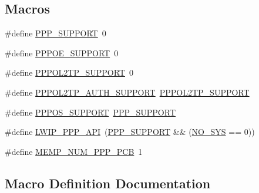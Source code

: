 \subsection*{Macros}
\begin{DoxyCompactItemize}
\item 
\#define \hyperlink{openmote-cc2538_2lwip_2src_2include_2netif_2ppp_2ppp__opts_8h_a746c0ebaef5399987d53a1426eba6273}{P\+P\+P\+\_\+\+S\+U\+P\+P\+O\+RT}~0
\item 
\#define \hyperlink{openmote-cc2538_2lwip_2src_2include_2netif_2ppp_2ppp__opts_8h_a71adab1a13b02856a922cf3edbda71b1}{P\+P\+P\+O\+E\+\_\+\+S\+U\+P\+P\+O\+RT}~0
\item 
\#define \hyperlink{openmote-cc2538_2lwip_2src_2include_2netif_2ppp_2ppp__opts_8h_a65f133dc4016cc42044f1bd2b941038f}{P\+P\+P\+O\+L2\+T\+P\+\_\+\+S\+U\+P\+P\+O\+RT}~0
\item 
\#define \hyperlink{openmote-cc2538_2lwip_2src_2include_2netif_2ppp_2ppp__opts_8h_a07cb038932116ecff7f0533d2cacc2b9}{P\+P\+P\+O\+L2\+T\+P\+\_\+\+A\+U\+T\+H\+\_\+\+S\+U\+P\+P\+O\+RT}~\hyperlink{openmote-cc2538_2lwip_2src_2include_2netif_2ppp_2ppp__opts_8h_a65f133dc4016cc42044f1bd2b941038f}{P\+P\+P\+O\+L2\+T\+P\+\_\+\+S\+U\+P\+P\+O\+RT}
\item 
\#define \hyperlink{openmote-cc2538_2lwip_2src_2include_2netif_2ppp_2ppp__opts_8h_ade11e60136d3d55e35f917f155dc13b9}{P\+P\+P\+O\+S\+\_\+\+S\+U\+P\+P\+O\+RT}~\hyperlink{openmote-cc2538_2lwip_2src_2include_2netif_2ppp_2ppp__opts_8h_a746c0ebaef5399987d53a1426eba6273}{P\+P\+P\+\_\+\+S\+U\+P\+P\+O\+RT}
\item 
\#define \hyperlink{openmote-cc2538_2lwip_2src_2include_2netif_2ppp_2ppp__opts_8h_a5a03fca0248c5e630f89afb39d2f0065}{L\+W\+I\+P\+\_\+\+P\+P\+P\+\_\+\+A\+PI}~(\hyperlink{openmote-cc2538_2lwip_2src_2include_2netif_2ppp_2ppp__opts_8h_a746c0ebaef5399987d53a1426eba6273}{P\+P\+P\+\_\+\+S\+U\+P\+P\+O\+RT} \&\& (\hyperlink{openmote-cc2538_2lwip_2test_2unit_2lwipopts_8h_ae00ba99de94a5bf84d832be8976df59b}{N\+O\+\_\+\+S\+YS} == 0))
\item 
\#define \hyperlink{openmote-cc2538_2lwip_2src_2include_2netif_2ppp_2ppp__opts_8h_a6721ea95cbd6afd6968470c2423b6482}{M\+E\+M\+P\+\_\+\+N\+U\+M\+\_\+\+P\+P\+P\+\_\+\+P\+CB}~1
\end{DoxyCompactItemize}


\subsection{Macro Definition Documentation}
\mbox{\label{openmote-cc2538_2lwip_2src_2include_2netif_2ppp_2ppp__opts_8h_a5a03fca0248c5e630f89afb39d2f0065}} 
